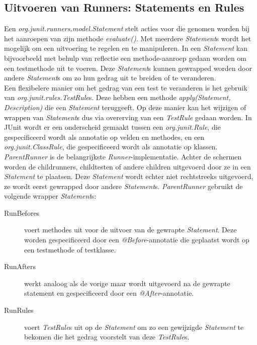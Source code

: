 \documentclass[i1]{oss}
\begin{document}
\subsection{Uitvoeren van Runners: Statements en Rules}

Een \emph{org.junit.runners.model.Statement} stelt acties voor die genomen worden bij het aanroepen van zijn methode \emph{evaluate()}. Met meerdere \emph{Statement}s wordt het mogelijk om een uitvoering te regelen en te manipuleren. In een \emph{Statement} kan bijvoorbeeld met behulp van reflectie een methode-aanroep gedaan worden om een testmethode uit te voeren. Deze \emph{Statement}s kunnen gewrapped worden door andere \emph{Statement}s om zo hun gedrag uit te breiden of te veranderen.\\

Een flexibelere manier om het gedrag van een test te veranderen is het gebruik van \emph{org.junit.rules.TestRule}s. Deze hebben een methode \emph{apply(Statement, Description)} die een \emph{Statement} teruggeeft. Op deze manier kan het wijzigen of wrappen van \emph{Statement}s dus via overerving van een \emph{TestRule} gedaan worden. In JUnit wordt er een onderscheid gemaakt tussen een \emph{org.junit.Rule}, die gespecificeerd wordt als annotatie op velden en methodes, en een \emph{org.junit.ClassRule}, die gespecificeerd wordt als annotatie op klassen.\\

\emph{ParentRunner} is de belangrijkste \emph{Runner}-implementatie. Achter de schermen worden de childrunners, childtesten of andere children uitgevoerd door ze in een \emph{Statement} te plaatsen. Deze \emph{Statement} wordt echter niet rechtstreeks uitgevoerd, ze wordt eerst gewrapped door andere \emph{Statement}s. \emph{ParentRunner} gebruikt de volgende wrapper \emph{Statement}s:

\begin{description}
\item[RunBefores] voert methodes uit voor de uitvoer van de gewrapte \emph{Statement}. Deze worden gespecificeerd door een \emph{@Before}-annotatie die geplaatst wordt op een testmethode of testklasse.
\item[RunAfters] werkt analoog als de vorige maar wordt uitgevoerd na de gewrapte statement en gespecificeerd door een \emph{@After}-annotatie.
\item[RunRules] voert \emph{TestRule}s uit op de \emph{Statement} om zo een gewijzigde \emph{Statement} te bekomen die het gedrag voorstelt van deze \emph{TestRule}s.
\end{description}
\end{document}
